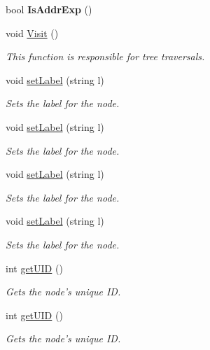 \begin{DoxyCompactItemize}
\item 
\hypertarget{classAstPostfixExpr_a84889c2ddd3eabd0966e08f85a2576c4}{bool {\bfseries Is\-Addr\-Exp} ()}\label{classAstPostfixExpr_a84889c2ddd3eabd0966e08f85a2576c4}

\item 
void \hyperlink{classAstPostfixExpr_ae3e7fdbd4c2bf888ee62760e6f422cad}{Visit} ()
\begin{DoxyCompactList}\small\item\em This function is responsible for tree traversals. \end{DoxyCompactList}\item 
void \hyperlink{classAST_a71d680856e95ff89f55d5311a552eba6}{set\-Label} (string l)
\begin{DoxyCompactList}\small\item\em Sets the label for the node. \end{DoxyCompactList}\item 
void \hyperlink{classAST_a71d680856e95ff89f55d5311a552eba6}{set\-Label} (string l)
\begin{DoxyCompactList}\small\item\em Sets the label for the node. \end{DoxyCompactList}\item 
void \hyperlink{classAST_a71d680856e95ff89f55d5311a552eba6}{set\-Label} (string l)
\begin{DoxyCompactList}\small\item\em Sets the label for the node. \end{DoxyCompactList}\item 
void \hyperlink{classAST_a71d680856e95ff89f55d5311a552eba6}{set\-Label} (string l)
\begin{DoxyCompactList}\small\item\em Sets the label for the node. \end{DoxyCompactList}\item 
int \hyperlink{classAST_ab7a5b1d9f1c2de0d98deb356f724a42c}{get\-U\-I\-D} ()
\begin{DoxyCompactList}\small\item\em Gets the node's unique I\-D. \end{DoxyCompactList}\item 
int \hyperlink{classAST_ab7a5b1d9f1c2de0d98deb356f724a42c}{get\-U\-I\-D} ()
\begin{DoxyCompactList}\small\item\em Gets the node's unique I\-D. \end{DoxyCompactList}\item 

\end{DoxyCompactItemize}

